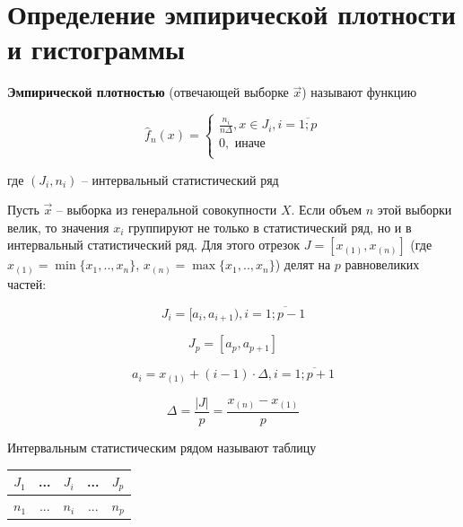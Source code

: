\documentclass[a4paper,14pt]{extreport} %
\begin{document}
\section{Определение эмпирической плотности и гистограммы}

\hfill 

    \textbf{Эмпирической плотностью} (отвечающей выборке $\vec x$) называют функцию

    \begin{equation*}
        \hat f_n(x) =
        \begin{cases}
            \frac{n_i}{n \Delta}, x \in J_i, i = \overline{1; p} \\
            0, \text{ иначе} \\
        \end{cases}
    \end{equation*}

где $(J_i, n_i)$ -- интервальный статистический ряд

\hfill

Пусть $\vec x$ -- выборка из генеральной совокупности $X$. Если объем $n$ этой выборки велик, то значения $x_i$ группируют не только в статистический ряд, но и в интервальный статистический ряд. Для этого отрезок
$J = [x_{(1)}, x_{(n)}]$ (где $x_{(1)}=\min\{x_1,..,x_n\}$, $x_{(n)}=\max\{x_1,..,x_n\}$) делят на $p$ равновеликих частей:

\begin{equation*}
    J_i = [a_i, a_{i+1}), i = \overline{1; p - 1}
\end{equation*}

\begin{equation*}
    J_{p} = [a_{p}, a_{p+1}]
\end{equation*}

$$a_i = x_{(1)} + (i-1)\cdot\Delta, i = \overline{1;p+1}$$

$$\Delta = \frac{|J|}{p} = \frac{x_{(n)} - x_{(1)}}{p}$$

    Интервальным статистическим рядом называют таблицу

    \begin{table}[H]
        \centering
        \begin{tabular}{|c|c|c|c|c|}
            \hline
            $J_1$ & ... & $J_i$ & ... & $J_p$ \\
            \hline
            $n_1$ & ... & $n_i$ & ... & $n_p$ \\
            \hline
        \end{tabular}
    \end{table}
\end{document}
